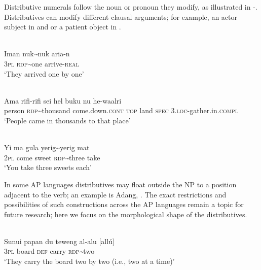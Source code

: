 Distributive numerals follow the noun or pronoun they modify, as illustrated in -. Distributives can modify different clausal arguments; for example, an actor subject in  and  or a patient object in .


\ea%
\label{bkm:Ref342655549}
\\
\gll Iman  nuk\textit{\~{}}nuk  aria-n\\  
    \textsc{3pl}   \textsc{rdp}\textit{\~{}}one   arrive-\textsc{real}\\
\glt `They arrived one by one' 
\z

    

   


\ea%
\label{bkm:Ref342738939}
\\
\gll  Ama    rifi-rifi    sei        hel  buku  nu  he-waalri \\  
    person    \textsc{rdp\~{}}thousand   come.down.\textsc{cont}    \textsc{top  } land  \textsc{spec}   3.\textsc{loc-}gather.in.\textsc{compl}  \\
\glt `People came in thousands to that place' 
\z

    
 

   

   

\ea%
\label{bkm:Ref342655553}
\\
\gll Yi   ma   gula   yerig\~{}yerig   mat\\  
     2\textsc{pl } come  sweet  \textsc{rdp}\textit{\~{}}three  take \\
\glt `You take three sweets each'
\z

   

  

   

In some AP languages distributives may float outside the NP to a position adjacent to the verb; an example is Adang, . The exact restrictions and possibilities of such constructions across the AP languages remain a topic for future research; here we focus on the morphological shape of the distributives.


\ea
\label{ex:8:1235}
\\
 \gll  Sunui{\textltailn}   papan   du   teweng al-alu  [all\'u]\\
   3\textsc{pl}    board  \textsc{def}   carry   \textsc{rdp}\textit{\~{}}two \\
 \glt `They carry the board two by two (i.e., two at a time)'
\z

